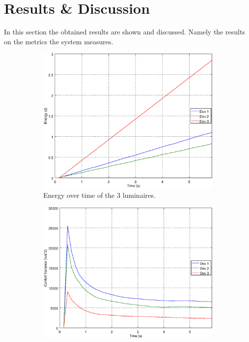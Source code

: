 \section{Results \& Discussion}\label{results}


In this section the obtained results are shown and discussed. Namely the results on the metrics the system measures.

\begin{figure}[ht]
    \centering
    \begin{subfigure}[t]{0.3\textwidth}
    \centering
    \includegraphics[width=.95\textwidth]{img/e_closed_o000}
    \caption{Energy over time of the 3 luminaires.}
    \label{fig:e_closed_o000}
    \end{subfigure}
    \begin{subfigure}[t]{0.3\textwidth}
    \centering
    \includegraphics[width=.95\textwidth]{img/f_closed_o000}

\end{subfigure}
\end{figure}
